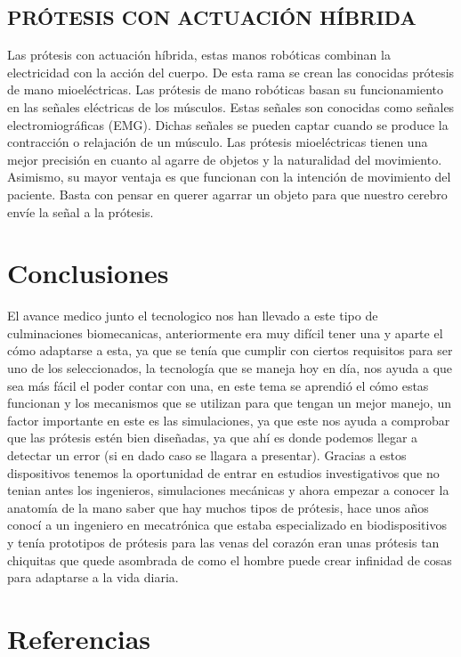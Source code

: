 \documentclass{article}
\begin{document}
\subsection{PRÓTESIS CON ACTUACIÓN HÍBRIDA}
Las prótesis con actuación híbrida, estas manos robóticas combinan la electricidad con la acción del cuerpo. De esta rama se crean las conocidas prótesis de mano mioeléctricas. Las prótesis de mano robóticas basan su funcionamiento en las señales eléctricas de los músculos. Estas señales son conocidas como señales electromiográficas (EMG). Dichas señales se pueden captar cuando se produce la contracción o relajación de un músculo. Las prótesis mioeléctricas tienen una mejor precisión en cuanto al agarre de objetos y la naturalidad del movimiento. Asimismo, su mayor ventaja es que funcionan con la intención de movimiento del paciente. Basta con pensar en querer agarrar un objeto para que nuestro cerebro envíe la señal a la prótesis.

\section{Conclusiones}
El avance medico junto el tecnologico nos han llevado a este tipo de culminaciones biomecanicas, anteriormente era muy difícil tener una y aparte el cómo adaptarse a esta, ya que se tenía que cumplir con ciertos requisitos para ser uno de los seleccionados, la tecnología que se maneja hoy en día, nos ayuda a que sea más fácil el poder contar con una, en este tema se aprendió el cómo estas funcionan y los mecanismos que se utilizan para que tengan  un mejor manejo, un factor importante en este es las simulaciones, ya que este nos ayuda a comprobar que las prótesis estén bien diseñadas, ya que ahí es donde podemos llegar a detectar un error (si en dado caso se llagara a presentar).
Gracias a estos dispositivos tenemos la oportunidad de entrar en estudios investigativos que no tenian antes los ingenieros, simulaciones mecánicas y ahora empezar a conocer la anatomía de la mano saber que hay muchos tipos de prótesis, hace unos años conocí a un ingeniero en mecatrónica que estaba especializado en biodispositivos y tenía prototipos de prótesis para las venas del corazón eran unas prótesis tan chiquitas que quede asombrada de como el hombre puede crear infinidad de cosas para adaptarse a la vida diaria.

\section{Referencias}



\end{document}

